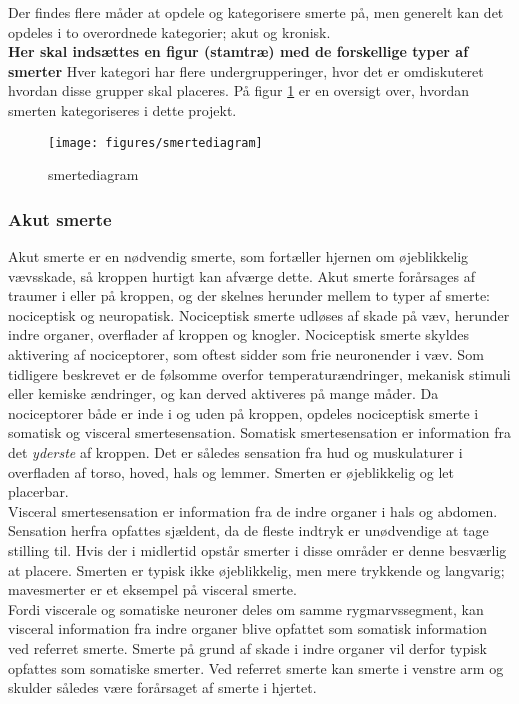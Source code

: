 {{Der findes flere måder at opdele og kategorisere smerte på, men generelt kan det opdeles i to overordnede kategorier; akut og kronisk. \\
\textbf{Her skal indsættes en figur (stamtræ) med de forskellige typer af smerter} 
Hver kategori har flere undergrupperinger, hvor det er omdiskuteret hvordan disse grupper skal placeres. \citep{Giangragorio1997} På figur \ref{smertediagram} er en oversigt over, hvordan smerten kategoriseres i dette projekt.

\begin{figure}[H]
	\caption{smertediagram}
	\label{smertediagram}
	\centering
	\texttt{[image: figures/smertediagram]}
	\flushleft
\end{figure}

\subsubsection{Akut smerte}
Akut smerte er en nødvendig smerte, som fortæller hjernen om øjeblikkelig vævsskade, så kroppen hurtigt kan afværge dette. Akut smerte forårsages af traumer i eller på kroppen, og der skelnes herunder mellem to typer af smerte: nociceptisk og neuropatisk. Nociceptisk smerte udløses af skade på væv, herunder indre organer, overflader af kroppen og knogler. Nociceptisk smerte skyldes aktivering af nociceptorer, som oftest sidder som frie neuronender i væv. Som tidligere beskrevet er de følsomme overfor temperaturændringer, mekanisk stimuli eller kemiske ændringer, og kan derved aktiveres på mange måder. Da nociceptorer både er inde i og uden på kroppen, opdeles nociceptisk smerte i somatisk og visceral smertesensation. Somatisk smertesensation er information fra det \textit{yderste} af kroppen. Det er således sensation fra hud og muskulaturer i overfladen af torso, hoved, hals og lemmer. \citep{Martini} Smerten er øjeblikkelig og let placerbar. \\
Visceral smertesensation er information fra de indre organer i hals og abdomen. Sensation herfra opfattes sjældent, da de fleste indtryk er unødvendige at tage stilling til. Hvis der i midlertid opstår smerter i disse områder er denne besværlig at placere. Smerten er typisk ikke øjeblikkelig, men mere trykkende og langvarig; mavesmerter er et eksempel på visceral smerte. \\
Fordi viscerale og somatiske neuroner deles om samme rygmarvssegment, kan visceral information fra indre organer blive opfattet som somatisk information ved referret smerte. Smerte på grund af skade i indre organer vil derfor typisk opfattes som somatiske smerter. Ved referret smerte kan smerte i venstre arm og skulder således være forårsaget af smerte i hjertet.

}}
